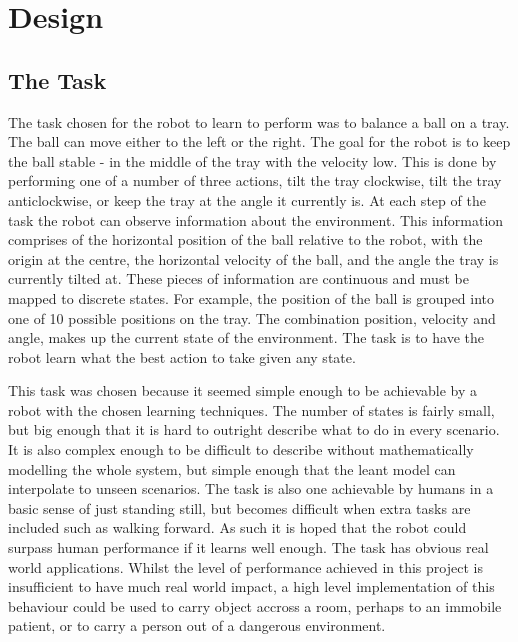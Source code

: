 \documentclass[12pt,a4paper]{article}
\begin{document}
\section{Design}

\subsection{The Task}
The task chosen for the robot to learn to perform was to balance a ball on a tray. The ball can move either to the left or the right. The goal for the robot is to keep the ball stable - in the middle of the tray with the velocity low. This is done by performing one of a number of three actions, tilt the tray clockwise, tilt the tray anticlockwise, or keep the tray at the angle it currently is. At each step of the task the robot can observe information about the environment. This information comprises of the horizontal position of the ball relative to the robot, with the origin at the centre, the horizontal velocity of the ball, and the angle the tray is currently tilted at. These pieces of information are continuous and must be mapped to discrete states. For example, the position of the ball is grouped into one of 10 possible positions on the tray. The combination position, velocity and angle, makes up the current state of the environment. The task is to have the robot learn what the best action to take given any state.

This task was chosen because it seemed simple enough to be achievable by a robot with the chosen learning techniques. The number of states is fairly small, but big enough that it is hard to outright describe what to do in every scenario. It is also complex enough to be difficult to describe without mathematically modelling the whole system, but simple enough that the leant model can interpolate to unseen scenarios. The task is also one achievable by humans in a basic sense of just standing still, but becomes difficult when extra tasks are included such as walking forward. As such it is hoped that the robot could surpass human performance if it learns well enough. The task has obvious real world applications. Whilst the level of performance achieved in this project is insufficient to have much real world impact, a high level implementation of this behaviour could be used to carry object accross a room, perhaps to an immobile patient, or to carry a person out of a dangerous environment.
\end{document}
